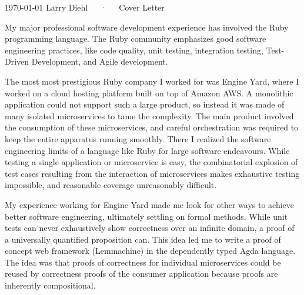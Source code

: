 \documentclass[11pt, a4paper]{awesome-cv}
\begin{document}
\makecvheader

\makecvfooter
  {\today}
  {Larry Diehl~~~·~~~Cover Letter}
  {}

\makelettertitle

\begin{cvletter}


My major professional software development experience has involved the
Ruby programming language.
The Ruby community emphasizes good software engineering practices,
like code quality, unit testing, integration testing, Test-Driven
Development, and Agile development.

The most most prestigious Ruby company I worked for was Engine Yard,
where I worked on a cloud hosting platform built
on top of Amazon AWS. A monolithic application could not support such
a large product, so instead it was made of many isolated microservices
to tame the complexity. The main product involved the consumption of
these microservices, and careful orchestration was required to keep the
entire apparatus running smoothly. There I
realized the software engineering limits of a language like
Ruby for large software endeavours. While testing a single application
or microservice is easy, the combinatorial explosion of test cases
resulting from the interaction of microservices makes exhaustive
testing impossible, and reasonable coverage unreasonably difficult.


My experience working for Engine Yard made me look for other ways to
achieve better software engineering, ultimately settling on formal
methods. While unit tests can never exhaustively show correctness over
an infinite domain, a proof of a universally quantified proposition
can. This idea led me to write a proof of concept web framework
(Lemmachine) in the dependently typed Agda language. The idea was that
proofs of correctness for individual microservices could be reused by
correctness proofs of the consumer application because proofs are inherently
compositional.


\end{cvletter}
\end{document}
